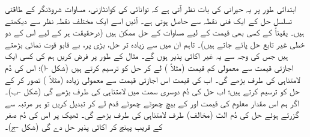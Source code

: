 ابتدائی طور پر یہ حیرانی کی بات نظر آتی ہے کہ توانائی کی کوانٹازنی، مساوات شروڈنگر کے طاقتی تسلسل حل کے ایک فنی  نقطہ سے حاصل ہوتی ہے۔ آئیں اسے ایک مختلف نقطہ نظر سے دیکھتے ہیں۔ یقیناً  کے کسی بھی قیمت کے لیے مساوات  کے حل ممکن ہیں (درحقیقت ہر  کے لیے اس کے دو خطی غیر تابع حل پائے جاتے ہیں)۔ تاہم ان میں سے زیادہ تر حل، بڑی  پر، بے قابو قوت نمائی بڑھتے ہیں جس کی وجہ سے یہ غیر اکائی پذیر ہوں گے۔ مثال کے طور پر فرض کریں ہم  کی کسی ایک اجازتی قیمت سے معمولی کم قیمت (مثلاً ) لے کر حل کو ترسیم کرتے ہیں (شکل -ا)؛ اس کی دُم لامتناہی کی طرف بڑھے گی۔ اب  کی قیمت اس  اجازتی قیمت سے معمولی زیادہ (مثلاً )  تصور کر کے حل کو ترسیم کرتے ہیں؛ اب حل کی دُم  دوسری سمت میں لامتناہی کی طرف
 بڑھے گی (شکل -ب)۔ اگر ہم اس مقدار معلوم کی قیمت  اور  کے بیچ چھوٹے چھوٹے قدم لے کر تبدیل کریں تو ہر مرتبہ  سے گزرتے ہوئے حل کی دُم الٹ (مخالف) طرف لامتناہی کی طرف بڑھے گی۔ ٹھیک  پر اس کی دُم صفر کے قریب پہنچ کر اکائی پذیر حل دے گی (شکل -ج)۔ 

